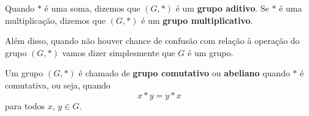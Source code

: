 \begin{observacao}
	Quando $*$ {\'e} uma soma, dizemos que $(G,*)$ {\'e} um \textbf{grupo aditivo}. Se $*$ {\'e} uma multiplica{\c c}{\~a}o, dizemos que $(G,*)$ {\'e} um \textbf{grupo multiplicativo}.

	Al\'em disso, quando n\~ao houver chance de confus\~ao com rela\c{c}\~ao \`a opera\c{c}\~ao do grupo $(G, *)$ vamos dizer simplesmente que $G$ \'e um grupo.
\end{observacao}

\begin{definicao}
	Um grupo $(G,*)$ {\'e} chamado de \textbf{grupo comutativo} ou \textbf{abeliano} quando $*$ {\'e} comutativa, ou seja, quando
	\[
		x*y = y*x
	\]
	para todos $x$, $y \in G$.
\end{definicao}

